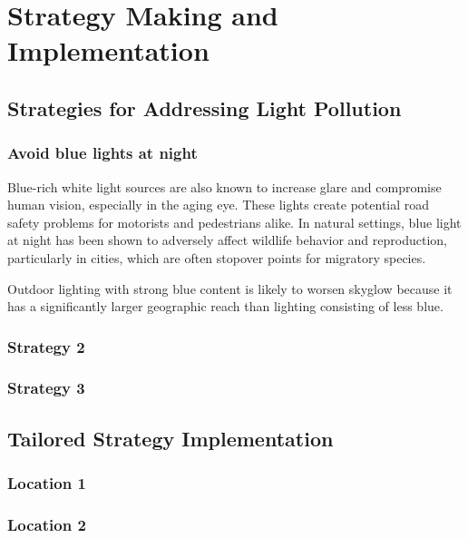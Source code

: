 \MinParskip{}

\section{Strategy Making and Implementation}



\subsection{Strategies for Addressing Light Pollution}

\subsubsection{Avoid blue lights at night}
Blue-rich white light sources are also known to increase glare and compromise human vision, especially in the aging eye. These lights create potential road safety problems for motorists and pedestrians alike. In natural settings, blue light at night has been shown to adversely affect wildlife behavior and reproduction, particularly in cities, which are often stopover points for migratory species.

Outdoor lighting with strong blue content is likely to worsen skyglow because it has a significantly larger geographic reach than lighting consisting of less blue. \cite{light_pollution}

\subsubsection{Strategy 2}

\subsubsection{Strategy 3}


\subsection{Tailored Strategy Implementation}

\subsubsection{Location 1}

\subsubsection{Location 2}


